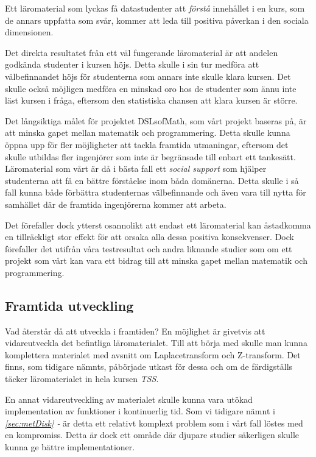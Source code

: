 \documentclass[12pt,a4paper,twoside,openright]{article}
\begin{document}
{Ett läromaterial som lyckas få datastudenter att \emph{förstå}
innehållet i en kurs, som de annars uppfatta som svår, kommer att leda
till positiva påverkan i den sociala
dimensionen. %

Det direkta resultatet från ett väl fungerande läromaterial är att
andelen godkända studenter i kursen höjs. Detta skulle i sin tur
medföra att välbefinnandet höjs för studenterna som annars inte skulle
klara kursen. Det skulle också möjligen medföra en minskad oro hos de
studenter som ännu inte läst kursen i fråga, eftersom den statistiska
chansen att klara kursen är större.

Det långsiktiga målet för projektet DSLsofMath, som vårt projekt
baseras på, är att minska gapet mellan matematik och
programmering. %
Detta skulle kunna öppna upp för fler möjligheter att tackla framtida
utmaningar, eftersom det skulle utbildas fler ingenjörer som inte är
begränsade till enbart ett tankesätt.
Läromaterial som vårt  är då i bästa fall ett \emph{social support}
som hjälper studenterna att få en bättre förståelse inom båda domänerna. Detta
skulle i så fall kunna både förbättra studenternas välbefinnande och
även vara till nytta för samhället där de framtida ingenjörerna
kommer att arbeta.

Det förefaller dock ytterst osannolikt att endast ett läromaterial kan
åstadkomma en tillräckligt stor effekt för att orsaka alla dessa
positiva konsekvenser. Dock förefaller det utifrån våra testresultat
och andra liknande studier som om ett projekt som vårt kan vara ett
bidrag till att minska gapet mellan matematik och programmering.

\subsection{Framtida utveckling}
Vad återstår då att utveckla i framtiden? En möjlighet är givetvis att
vidareutveckla det befintliga läromaterialet. Till att börja med
skulle man kunna komplettera materialet med avsnitt om
Laplacetransform och Z-transform. Det finns, som tidigare nämnts,
påbörjade utkast för dessa och om de färdigställs täcker
läromaterialet in hela kursen \textit{TSS}.

En annat vidareutveckling av materialet skulle kunna vara utökad
implementation av funktioner i kontinuerlig tid. Som vi tidigare nämnt
i \textit{\ref{sec:metDisk} - } är detta ett
relativt komplext problem som i vårt fall löstes med en
kompromiss. Detta är dock ett område där djupare studier säkerligen
skulle kunna ge bättre implementationer.

}
\end{document}
